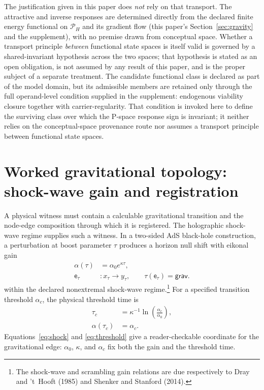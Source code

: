 \documentclass[10pt,twoside,a5paper]{article}
\newcommand{\Pspace}{\ensuremath{\mathcal P_H}}
\newcommand{\Grav}{\ensuremath{\mathsf{grav}}}
\newcommand{\Edge}{\ensuremath{\mathsf e}}
\theoremstyle{definition}
\begin{document}
The justification given in this paper does \emph{not} rely on that transport. The
attractive and inverse responses are determined directly from the declared finite
energy functional on $\Pspace$ and its gradient flow (this paper's
Section~\ref{sec:gravity} and the supplement), with no premise drawn from conceptual
space. Whether a transport principle \emph{between} functional state spaces is itself
valid is governed by a shared-invariant hypothesis across the two spaces; that
hypothesis is stated as an open obligation, is not assumed by any result of this
paper, and is the proper subject of a separate treatment. The candidate functional class is declared as part of the model domain, but its
admissible members are retained only through the full operand-level condition
supplied in the supplement: endogenous viability closure together with
carrier-regularity.  That condition is invoked here to define the surviving
class over which the P-space response sign is invariant; it neither relies on
the conceptual-space provenance route nor assumes a transport principle between
functional state spaces.

\section{Worked gravitational topology: shock-wave gain and registration}
\label{sec:worked}

A physical witness must contain a calculable gravitational transition and the
node-edge composition through which it is registered. The holographic shock-wave
regime supplies such a witness. In a two-sided AdS black-hole construction, a
perturbation at boost parameter $\tau$ produces a horizon null shift with eikonal
gain
\begin{equation}
\begin{aligned}
\alpha(\tau)&=\alpha_0e^{\kappa\tau},\\
\Edge_\tau&:x_\tau\longrightarrow y_\tau,
\qquad \tau(\Edge_\tau)=\Grav.
\end{aligned}
\label{eq:shock}
\end{equation}
within the declared nonextremal shock-wave regime.\footnote{The shock-wave
and scrambling gain relations are due respectively to Dray and 't~Hooft (1985)
and Shenker and Stanford (2014).} For a specified transition threshold $\alpha_c$,
the physical threshold time is
\begin{equation}
\begin{aligned}
\tau_c&=\kappa^{-1}\ln\!\left(\frac{\alpha_c}{\alpha_0}\right),\\
\alpha(\tau_c)&=\alpha_c.
\end{aligned}
\label{eq:threshold}
\end{equation}
Equations~\eqref{eq:shock} and \eqref{eq:threshold} give a reader-checkable
coordinate for the gravitational edge: $\alpha_0$, $\kappa$, and $\alpha_c$ fix
both the gain and the threshold time.
\end{document}
